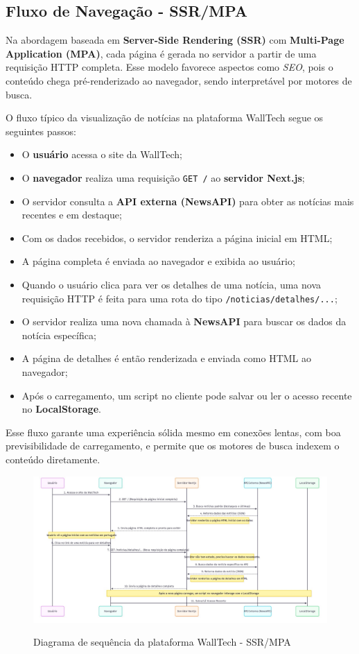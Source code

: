 \subsection{Fluxo de Navegação - SSR/MPA}
\label{subsec:fluxo-ssr}

Na abordagem baseada em \textbf{Server-Side Rendering (SSR)} com \textbf{Multi-Page Application (MPA)}, cada página é gerada no servidor a partir de uma requisição HTTP completa. Esse modelo favorece aspectos como \textit{SEO}, pois o conteúdo chega pré-renderizado ao navegador, sendo interpretável por motores de busca.

O fluxo típico da visualização de notícias na plataforma WallTech segue os seguintes passos:

\begin{itemize}
  \item O \textbf{usuário} acessa o site da WallTech;
  \item O \textbf{navegador} realiza uma requisição \texttt{GET /} ao \textbf{servidor Next.js};
  \item O servidor consulta a \textbf{API externa (NewsAPI)} para obter as notícias mais recentes e em destaque;
  \item Com os dados recebidos, o servidor renderiza a página inicial em HTML;
  \item A página completa é enviada ao navegador e exibida ao usuário;
  \item Quando o usuário clica para ver os detalhes de uma notícia, uma nova requisição HTTP é feita para uma rota do tipo \texttt{/noticias/detalhes/...};
  \item O servidor realiza uma nova chamada à \textbf{NewsAPI} para buscar os dados da notícia específica;
  \item A página de detalhes é então renderizada e enviada como HTML ao navegador;
  \item Após o carregamento, um script no cliente pode salvar ou ler o acesso recente no \textbf{LocalStorage}.
\end{itemize}

Esse fluxo garante uma experiência sólida mesmo em conexões lentas, com boa previsibilidade de carregamento, e permite que os motores de busca indexem o conteúdo diretamente.

\begin{figure}[H]
  \centering
  \caption{Diagrama de sequência da plataforma WallTech - SSR/MPA}
  \includegraphics[width=1\textwidth]{media/wall_tech_sequence_diagram.jpeg}
  \label{fig:sequence-diagram}
\end{figure}

